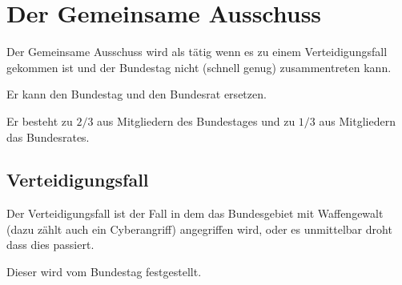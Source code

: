 \documentclass{article}
\begin{document}
\section{Der Gemeinsame Ausschuss} 
Der Gemeinsame Ausschuss wird als  tätig wenn es zu einem Verteidigungsfall gekommen ist und der Bundestag nicht (schnell genug) zusammentreten kann.

Er kann den Bundestag und den Bundesrat ersetzen.

Er besteht zu $2/3$ aus Mitgliedern des Bundestages und zu $1/3$ aus Mitgliedern das Bundesrates.

\subsection{Verteidigungsfall}
Der Verteidigungsfall ist der Fall in dem das Bundesgebiet mit Waffengewalt (dazu zählt auch ein Cyberangriff) angegriffen wird, oder es unmittelbar droht dass dies passiert.

Dieser wird vom Bundestag festgestellt.
\end{document}

